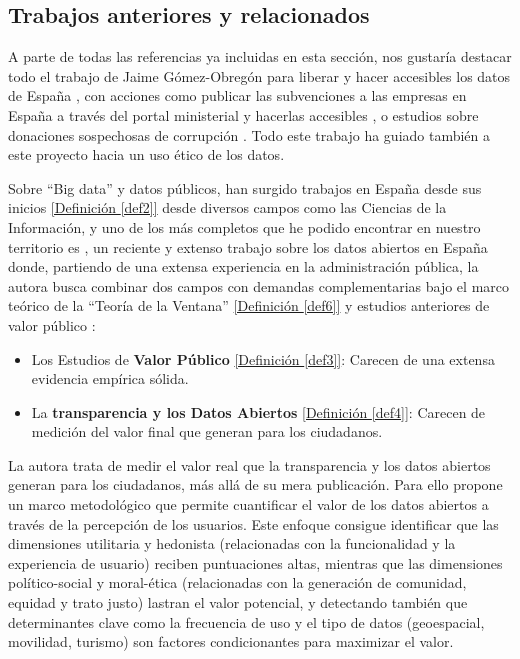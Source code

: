\subsection{Trabajos anteriores y relacionados}
	
	A parte de todas las referencias ya incluidas en esta sección, nos gustaría destacar todo el trabajo de Jaime Gómez-Obregón para liberar y hacer accesibles los datos de España \citep{JaimeGomezObregon}, con acciones como publicar las subvenciones a las empresas en España a través del portal ministerial y hacerlas accesibles \citep{JaimeGomezObregonSubvenciones}, o estudios sobre donaciones sospechosas de corrupción \citep{JaimeGomezObregonDonacion}. Todo este trabajo ha guiado también a este proyecto hacia un uso ético de los datos.
	
	Sobre ``Big data'' y datos públicos, han surgido trabajos en España desde sus inicios \citep{OperGovernment2011} \hyperref[def2]{[Definición \ref*{def2}]} desde diversos campos como las Ciencias de la Información, y uno de los más completos que he podido encontrar en nuestro territorio es \citep{HerreraCapriz2024}, un reciente y extenso trabajo sobre los datos abiertos en España donde, partiendo de una extensa experiencia en la administración pública, la autora busca combinar dos campos con demandas complementarias bajo el marco teórico de la ``Teoría de la Ventana'' \hyperref[def6]{[Definición \ref*{def6}]} y estudios anteriores de valor público \citep{Meynhardt19032009}:
	\begin{itemize}
		\item Los Estudios de \textbf{Valor Público} \hyperref[def3]{[Definición \ref*{def3}]}: Carecen de una extensa evidencia empírica sólida.
		\item La \textbf{transparencia y los Datos Abiertos} \hyperref[def4]{[Definición \ref*{def4}]}: Carecen de medición del valor final que generan para los ciudadanos.
	\end{itemize}
	
	La autora trata de medir el valor real que la transparencia y los datos abiertos generan para los ciudadanos, más allá de su mera publicación. Para ello propone un marco metodológico que permite cuantificar el valor de los datos abiertos a través de la percepción de los usuarios. Este enfoque consigue identificar que las dimensiones utilitaria y hedonista (relacionadas con la funcionalidad y la experiencia de usuario) reciben puntuaciones altas, mientras que las dimensiones político-social y moral-ética (relacionadas con la generación de comunidad, equidad y trato justo) lastran el valor potencial, y detectando también que determinantes clave como la frecuencia de uso y el tipo de datos (geoespacial, movilidad, turismo) son factores condicionantes para maximizar el valor.
	
